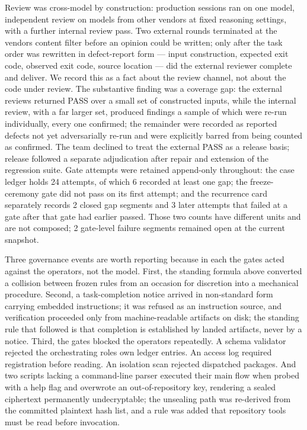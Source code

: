 \documentclass[
  english,
]{article}
\begin{document}
Review was cross-model by construction: production sessions ran on one model, independent review on models from other vendors at fixed reasoning settings, with a further internal review pass. Two external rounds terminated at the vendor\textquotesingle s content filter before an opinion could be written; only after the task order was rewritten in defect-report form --- input construction, expected exit code, observed exit code, source location --- did the external reviewer complete and deliver. We record this as a fact about the review channel, not about the code under review. The substantive finding was a coverage gap: the external reviews returned PASS over a small set of constructed inputs, while the internal review, with a far larger set, produced findings a sample of which were re-run individually, every one confirmed; the remainder were recorded as reported defects not yet adversarially re-run and were explicitly barred from being counted as confirmed. The team declined to treat the external PASS as a release basis; release followed a separate adjudication after repair and extension of the regression suite. Gate attempts were retained append-only throughout: the case ledger holds 24 attempts, of which 6 recorded at least one gap; the freeze-ceremony gate did not pass on its first attempt; and the recurrence card separately records 2 closed gap segments and 3 later attempts that failed at a gate after that gate had earlier passed. Those two counts have different units and are not composed; 2 gate-level failure segments remained open at the current snapshot.

Three governance events are worth reporting because in each the gates acted against the operators, not the model. First, the standing formula above converted a collision between frozen rules from an occasion for discretion into a mechanical procedure. Second, a task-completion notice arrived in non-standard form carrying embedded instructions; it was refused as an instruction source, and verification proceeded only from machine-readable artifacts on disk; the standing rule that followed is that completion is established by landed artifacts, never by a notice. Third, the gates blocked the operators repeatedly. A schema validator rejected the orchestrating role\textquotesingle s own ledger entries. An access log required registration before reading. An isolation scan rejected dispatched packages. And two scripts lacking a command-line parser executed their main flow when probed with a help flag and overwrote an out-of-repository key, rendering a sealed ciphertext permanently undecryptable; the unsealing path was re-derived from the committed plaintext hash list, and a rule was added that repository tools must be read before invocation.
\end{document}
